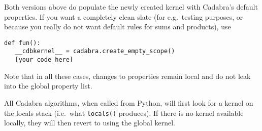 Both versions above do populate the newly created kernel with
Cadabra's default properties. If you want a completely clean slate
(for e.g.~testing purposes, or because you really do not want default
rules for sums and products), use
\begin{verbatim}
def fun():
   __cdbkernel__ = cadabra.create_empty_scope()
   [your code here]
\end{verbatim}
Note that in all these cases, changes to properties remain local and
do not leak into the global property list.

All Cadabra algorithms, when called from Python, will first look for a
kernel on the locals stack (i.e.~what \verb|locals()| produces). If
there is no kernel available locally, they will then revert to using
the global kernel. 

